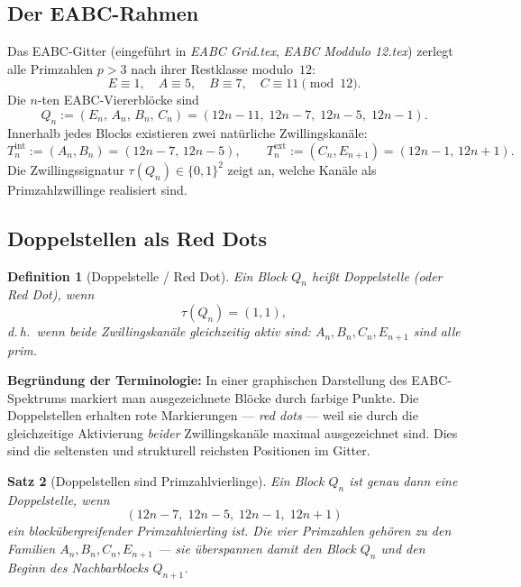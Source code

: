 \documentclass[12pt,a4paper]{article}
\newtheorem{definition}{Definition}[section]
\newtheorem{satz}[definition]{Satz}
\begin{document}
\subsection{Der EABC-Rahmen}

Das EABC-Gitter (eingeführt in \textit{EABC Grid.tex}, \textit{EABC Moddulo 12.tex})
zerlegt alle Primzahlen $p > 3$ nach ihrer Restklasse modulo~$12$:
\[
  E \equiv 1,\quad A \equiv 5,\quad B \equiv 7,\quad C \equiv 11 \pmod{12}.
\]
Die $n$-ten EABC-Viererblöcke sind
\[
  Q_n := (E_n,\, A_n,\, B_n,\, C_n)
  = (12n{-}11,\; 12n{-}7,\; 12n{-}5,\; 12n{-}1).
\]
Innerhalb jedes Blocks existieren zwei natürliche Zwillingskanäle:
\[
  T_n^{\mathrm{int}} := (A_n, B_n) = (12n{-}7,\, 12n{-}5),
  \qquad
  T_n^{\mathrm{ext}} := (C_n, E_{n+1}) = (12n{-}1,\, 12n{+}1).
\]
Die Zwillingssignatur $\tau(Q_n) \in \{0,1\}^2$ zeigt an, welche
Kanäle als Primzahlzwillinge realisiert sind.

\subsection{Doppelstellen als Red Dots}

\begin{definition}[Doppelstelle / Red Dot]
\label{def:reddot}
Ein Block $Q_n$ heißt \emph{Doppelstelle} (oder \emph{Red Dot}), wenn
\[
  \tau(Q_n) = (1,1),
\]
d.\,h.\ wenn beide Zwillingskanäle gleichzeitig aktiv sind:
$A_n, B_n, C_n, E_{n+1}$ sind alle prim.
\end{definition}

\begin{tcolorbox}[reddot]
\textbf{Begründung der Terminologie:}
In einer graphischen Darstellung des EABC-Spektrums markiert man
ausgezeichnete Blöcke durch farbige Punkte. Die Doppelstellen erhalten
rote Markierungen --- \emph{red dots} --- weil sie durch die gleichzeitige
Aktivierung \emph{beider} Zwillingskanäle maximal ausgezeichnet sind.
Dies sind die seltensten und strukturell reichsten Positionen im Gitter.
\end{tcolorbox}

\begin{satz}[Doppelstellen sind Primzahlvierlinge]
\label{satz:vierlinge}
Ein Block $Q_n$ ist genau dann eine Doppelstelle, wenn
\[
  (12n{-}7,\; 12n{-}5,\; 12n{-}1,\; 12n{+}1)
\]
ein blockübergreifender Primzahlvierling ist. Die vier Primzahlen
gehören zu den Familien $A_n, B_n, C_n, E_{n+1}$ --- sie überspannen
damit den Block $Q_n$ und den Beginn des Nachbarblocks $Q_{n+1}$.
\end{satz}
\end{document}
